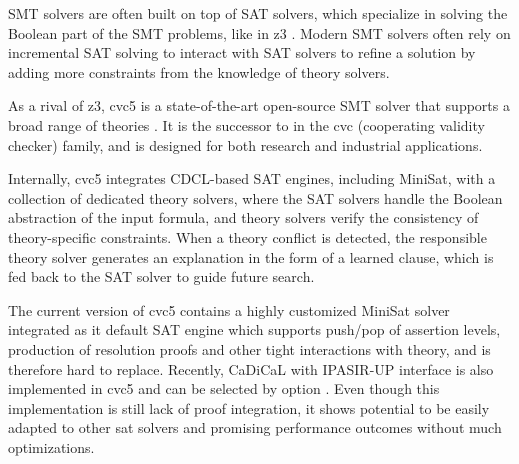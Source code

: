 SMT solvers are often built on top of SAT solvers, which specialize in solving the Boolean part of the SMT problems, like in z3 \cite{10.1007/978-3-540-78800-3_24}. Modern SMT solvers often rely on incremental SAT solving to interact with SAT solvers to refine a solution by adding more constraints from the knowledge of theory solvers.

As a rival of z3, cvc5 is a state-of-the-art open-source SMT solver that supports a broad range of theories \cite{10.1007/978-3-030-99524-9_24}. It is the successor to  in the cvc (cooperating validity checker) family, and is designed for both research and industrial applications.

Internally, cvc5 integrates CDCL-based SAT engines, including  MiniSat, with a collection of dedicated theory solvers, where the SAT solvers handle the Boolean abstraction of the input formula, and theory solvers verify the consistency of theory-specific constraints. When a theory conflict is detected, the responsible theory solver generates an explanation in the form of a learned clause, which is fed back to the SAT solver to guide future search.

The current version of cvc5 contains a highly customized MiniSat solver integrated as it default SAT engine which supports push/pop of assertion levels, production of resolution proofs and other tight interactions with theory, and is therefore hard to replace. Recently, CaDiCaL with IPASIR-UP interface is also implemented in cvc5 and can be selected by option . Even though this implementation is still lack of proof integration, it shows potential to be easily adapted to other sat solvers and promising performance outcomes without much optimizations.
